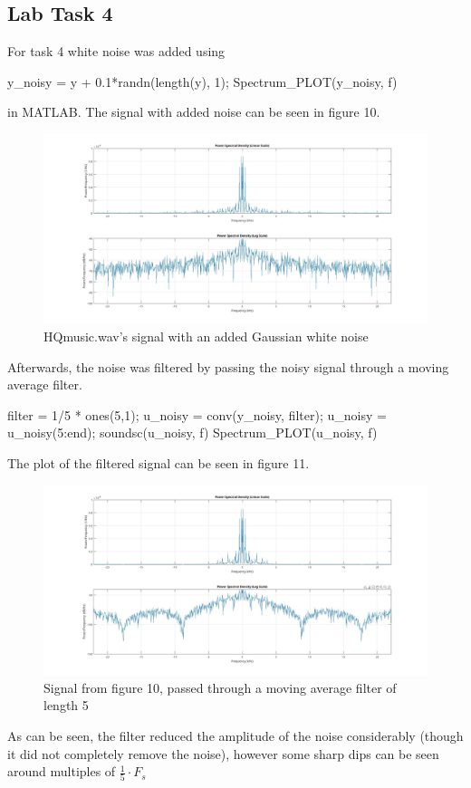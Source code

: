 \documentclass[a4paper,11pt]{article}
\begin{document}
\subsection{Lab Task 4}
For task 4 white noise was added using 
\begin{ffcode}
y_noisy = y + 0.1*randn(length(y), 1);
Spectrum_PLOT(y_noisy, f)
\end{ffcode}
in MATLAB. The signal with added noise can be seen in figure 10.
\begin{figure}[H]
    \hspace{-55pt}\includegraphics[scale=0.28]{./images/Task4-noisy.jpg}
    \caption{HQmusic.wav's signal with an added Gaussian white noise}
    \label{fig:my_label}
\end{figure}

Afterwards, the noise was filtered by passing the noisy signal through a moving average filter.
\begin{ffcode}
filter = 1/5 * ones(5,1);
u_noisy = conv(y_noisy, filter);
u_noisy = u_noisy(5:end);
soundsc(u_noisy, f)
Spectrum_PLOT(u_noisy, f)
\end{ffcode}
The plot of the filtered signal can be seen in figure 11.
\begin{figure}[H]
    \hspace{-40pt}\includegraphics[scale=0.28]{./images/Task4-filtered}
    \caption{Signal from figure 10, passed through a moving average filter of length 5}
    \label{fig:my_label}
\end{figure}
As can be seen, the filter reduced the amplitude of the noise considerably (though it did not completely remove the noise), however some sharp dips can be seen around multiples of $\frac{1}{5} \cdot F_s$
\end{document}
